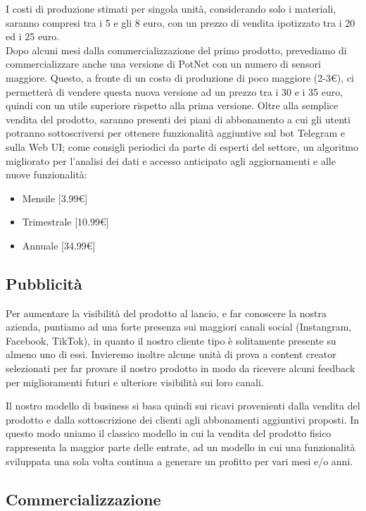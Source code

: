 I costi di produzione stimati per singola unità, considerando solo i materiali, saranno compresi tra i 5 e gli 8 euro, con un prezzo di vendita ipotizzato tra i 20 ed i 25 euro. \\Dopo alcuni mesi dalla commercializzazione del primo prodotto, prevediamo di commercializzare anche una versione di PotNet con un numero di sensori maggiore. Questo, a fronte di un costo di produzione di poco maggiore (2-3€), ci permetterà di vendere questa nuova versione ad un prezzo tra i 30 e i 35 euro, quindi con un utile superiore rispetto alla prima versione.
\newline\newline Oltre alla semplice vendita del prodotto, saranno presenti dei piani di abbonamento a cui gli utenti potranno sottoscriversi per ottenere funzionalità aggiuntive sul bot Telegram e sulla Web UI; come consigli periodici da parte di esperti del settore, un algoritmo migliorato per l'analisi dei dati e accesso anticipato agli aggiornamenti e alle nuove funzionalità:
\begin{itemize}
	\item Mensile [3.99€]
	\item Trimestrale [10.99€]
	\item Annuale [34.99€]
\end{itemize}

\subsection{Pubblicità}

Per aumentare la visibilità del prodotto al lancio, e far conoscere la nostra azienda, puntiamo ad una forte presenza sui maggiori canali social (Instangram, Facebook, TikTok), in quanto il nostro cliente tipo è solitamente presente su almeno uno di essi. Invieremo inoltre alcune unità di prova a content creator selezionati per far provare il nostro prodotto in modo da ricevere alcuni feedback per miglioramenti futuri e ulteriore visibilità sui loro canali.

Il nostro modello di business si basa quindi sui ricavi provenienti dalla vendita del prodotto e dalla sottoscrizione dei clienti agli abbonamenti aggiuntivi proposti. In questo modo uniamo il classico modello in cui la vendita del prodotto fisico rappresenta la maggior parte delle entrate, ad un modello in cui una funzionalità sviluppata una sola volta continua a generare un profitto per vari mesi e/o anni.

\subsection{Commercializzazione}

